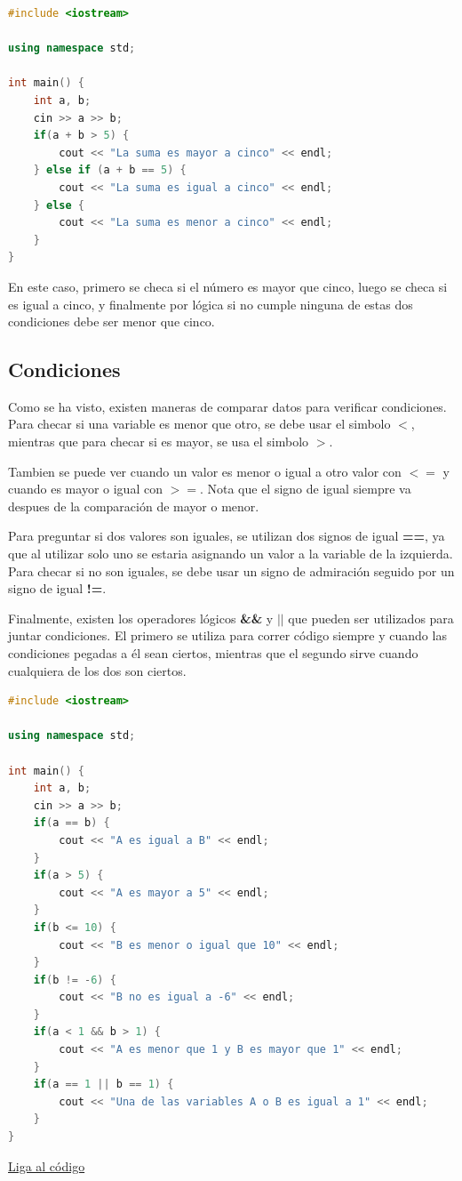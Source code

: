 \documentclass{article}
\begin{document}
\begin{lstlisting}[language=C++, caption=Else if]
#include <iostream>

using namespace std;

int main() {
    int a, b;
    cin >> a >> b;
    if(a + b > 5) {
        cout << "La suma es mayor a cinco" << endl;
    } else if (a + b == 5) {
        cout << "La suma es igual a cinco" << endl;
    } else {
        cout << "La suma es menor a cinco" << endl;
    }
}
\end{lstlisting}

En este caso, primero se checa si el número es mayor que cinco, luego se checa si es igual a cinco, y finalmente por lógica si no cumple ninguna de estas dos condiciones debe ser menor que cinco.

\subsection{Condiciones}

Como se ha visto, existen maneras de comparar datos para verificar condiciones. Para checar si una variable es menor que otro, se debe usar el simbolo \textbf{$<$}, mientras que para checar si es mayor, se usa el simbolo \textbf{$>$}.

Tambien se puede ver cuando un valor es menor o igual a otro valor con \textbf{$<=$} y cuando es mayor o igual con \textbf{$>=$}. Nota que el signo de igual siempre va despues de la comparación de mayor o menor.

Para preguntar si dos valores son iguales, se utilizan dos signos de igual \textbf{==}, ya que al utilizar solo uno se estaria asignando un valor a la variable de la izquierda. Para checar si no son iguales, se debe usar un signo de admiración seguido por un signo de igual \textbf{!=}.

Finalmente, existen los operadores lógicos \textbf{\&\&} y \textbf{$||$} que pueden ser utilizados para juntar condiciones. El primero se utiliza para correr código siempre y cuando las condiciones pegadas a él sean ciertos, mientras que el segundo sirve cuando cualquiera de los dos son ciertos.

\begin{lstlisting}[language=C++, caption=Condiciones]
#include <iostream>

using namespace std;

int main() {
    int a, b;
    cin >> a >> b;
    if(a == b) {
        cout << "A es igual a B" << endl;
    }
    if(a > 5) {
        cout << "A es mayor a 5" << endl;
    }
    if(b <= 10) {
        cout << "B es menor o igual que 10" << endl;
    }
    if(b != -6) {
        cout << "B no es igual a -6" << endl;
    }
    if(a < 1 && b > 1) {
        cout << "A es menor que 1 y B es mayor que 1" << endl;
    }
    if(a == 1 || b == 1) {
        cout << "Una de las variables A o B es igual a 1" << endl;
    }
}
\end{lstlisting}
\href{https://repl.it/@Jamesscn/Condiciones}{Liga al código}\\
\end{document}
